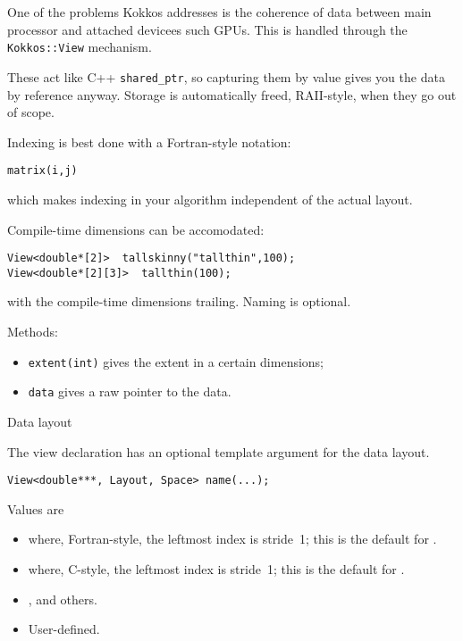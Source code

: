 One of the problems Kokkos addresses is the coherence of data between
main processor and attached devicees such \acp{GPU}.
This is handled through the \lstinline+Kokkos::View+ mechanism.


These act like C++ \lstinline+shared_ptr+, so capturing them by value
gives you the data by reference anyway.
Storage is automatically freed, RAII-style,
when they go out of scope.

Indexing is best done with a Fortran-style notation:
\begin{lstlisting}
matrix(i,j)
\end{lstlisting}
which makes indexing in your algorithm independent
of the actual layout.

Compile-time dimensions can be accomodated:
\begin{lstlisting}
View<double*[2]>  tallskinny("tallthin",100);
View<double*[2][3]>  tallthin(100);
\end{lstlisting}
with the compile-time dimensions trailing. Naming is optional.

Methods:
\begin{itemize}
\item \lstinline{extent(int)} gives the extent in a certain dimensions;
\item \lstinline{data} gives a raw pointer to the data.
\end{itemize}

 {Data layout}

The view declaration has an optional template argument for the data layout.
\begin{lstlisting}
View<double***, Layout, Space> name(...);
\end{lstlisting}
Values are 
\begin{itemize}
\item {} where, Fortran-style, the leftmost index is stride~1;
  this is the default for .
\item {} where, C-style, the leftmost index is stride~1;
  this is the default for .
\item {},  and others.
\item User-defined.
\end{itemize}


